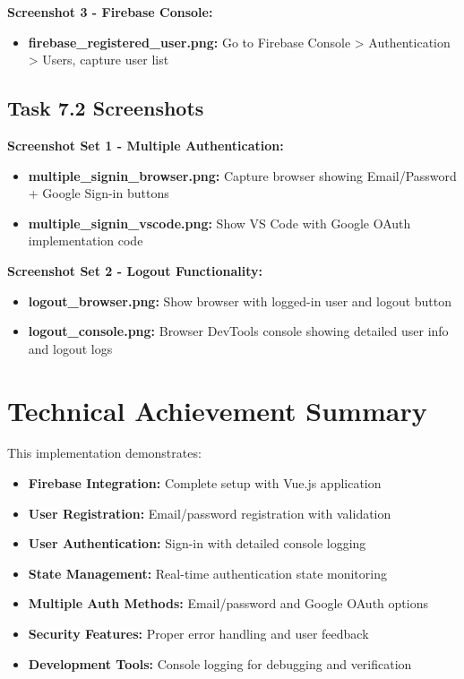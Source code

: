 \documentclass[11pt,a4paper]{article}
\begin{document}
\textbf{Screenshot 3 - Firebase Console:}
\begin{itemize}
    \item \textbf{firebase\_registered\_user.png:} Go to Firebase Console > Authentication > Users, capture user list
\end{itemize}

\subsection{Task 7.2 Screenshots}

\textbf{Screenshot Set 1 - Multiple Authentication:}
\begin{itemize}
    \item \textbf{multiple\_signin\_browser.png:} Capture browser showing Email/Password + Google Sign-in buttons
    \item \textbf{multiple\_signin\_vscode.png:} Show VS Code with Google OAuth implementation code
\end{itemize}

\textbf{Screenshot Set 2 - Logout Functionality:}
\begin{itemize}
    \item \textbf{logout\_browser.png:} Show browser with logged-in user and logout button
    \item \textbf{logout\_console.png:} Browser DevTools console showing detailed user info and logout logs
\end{itemize}

\section{Technical Achievement Summary}

This implementation demonstrates:
\begin{itemize}
    \item \textbf{Firebase Integration:} Complete setup with Vue.js application
    \item \textbf{User Registration:} Email/password registration with validation
    \item \textbf{User Authentication:} Sign-in with detailed console logging
    \item \textbf{State Management:} Real-time authentication state monitoring
    \item \textbf{Multiple Auth Methods:} Email/password and Google OAuth options
    \item \textbf{Security Features:} Proper error handling and user feedback
    \item \textbf{Development Tools:} Console logging for debugging and verification
\end{itemize}
\end{document}

